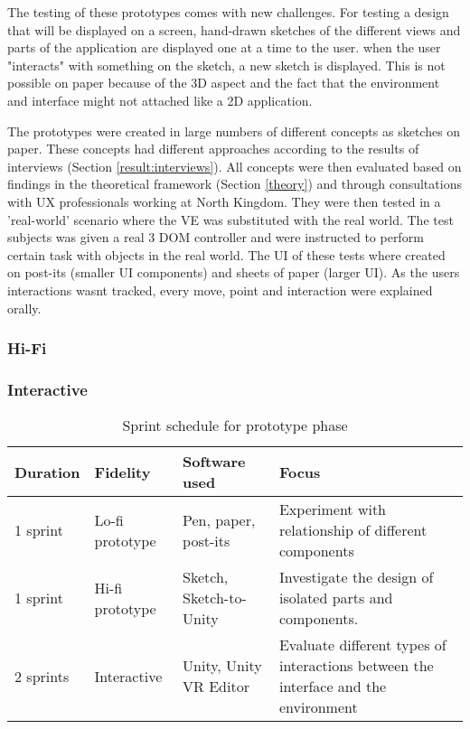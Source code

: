 The testing of these prototypes comes with new challenges. For testing a design that will be displayed on a screen, hand-drawn sketches of the different views and parts of the application are displayed one at a time to the user. when the user "interacts" with something on the sketch, a new sketch is displayed. This is not possible on paper because of the 3D aspect and the fact that the environment and interface might not attached like a 2D application.

The prototypes were created in large numbers of different concepts as sketches on paper. These concepts had different approaches according to the results of interviews (Section \ref{result:interviews}). All concepts were then evaluated based on findings in the theoretical framework (Section \ref{theory}) and through consultations with UX professionals working at North Kingdom. They were then tested in a 'real-world' scenario where the VE was substituted with the real world. The test subjects was given a real 3 DOM controller and were instructed to perform certain task with objects in the real world. The UI of these tests where created on post-its (smaller UI components) and sheets of paper (larger UI). As the users interactions wasnt tracked, every move, point and interaction were explained orally.
\subsubsection{Hi-Fi}
\label{method:prototype:hifi}
\subsubsection{Interactive}
\label{method:prototype:interactive}


\begin{table}[]
  \centering
  \caption{Sprint schedule for prototype phase}
  \label{table:sprints}
  \begin{tabular}{|l|l|l| p{5cm}|}
     \hline
    \textbf{Duration} & \textbf{Fidelity} & \textbf{Software used} & \textbf{Focus} \\\hline
    1 sprint                         & Lo-fi prototype  & Pen, paper, post-its    & Experiment with relationship of different components                               \\\hline
    1 sprint                        & Hi-fi prototype & Sketch, Sketch-to-Unity & Investigate the design of isolated parts and components.                           \\\hline
    2 sprints                 & Interactive   & Unity, Unity VR Editor  & Evaluate different types of interactions between the interface and the environment  \\\hline
  \end{tabular}
\end{table}

